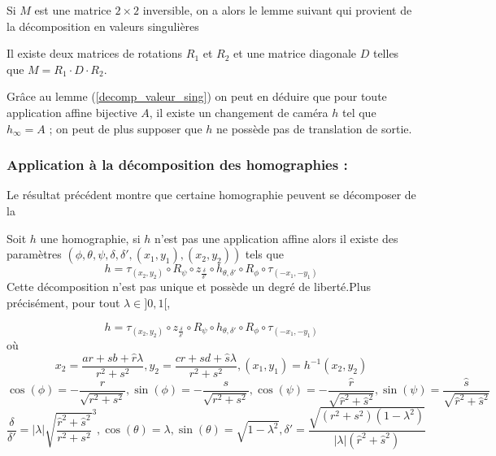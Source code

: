 \begin{remarque}
Si  $M$ est une matrice $2\times 2$ inversible, on a alors le lemme suivant qui provient de la décomposition en valeurs singulières \cite{morel2009asift}
\begin{lem}
Il existe deux matrices de rotations $R_1$ et $R_2$  et une matrice diagonale $D$ telles que $M = R_1 \cdot D \cdot R_2$.
\label{decomp_valeur_sing}
\end{lem}
Grâce au lemme (\ref{decomp_valeur_sing}) on peut en déduire que pour toute application affine bijective $A$, il existe un changement de caméra $h$ tel que $h_\infty = A$ ; on peut de plus supposer que $h$ ne possède pas de translation de sortie.
\end{remarque}


\subsubsection{Application à la décomposition des homographies :}
Le résultat précédent montre que certaine homographie peuvent se décomposer de la
\begin{thm}
Soit $h$ une homographie, si $h$ n'est pas une application affine alors il existe des paramètres $(\phi,\theta,\psi,\delta,\delta',(x_1,y_1),(x_2,y_2))$ tels que 
\begin{equation*}
h = \tau_{(x_2,y_2)} \circ R_{\psi} \circ z_{\frac{\delta}{\delta'}} \circ h_{\theta,\delta'} \circ R_{\phi} \circ \tau_{(-x_1,-y_1)}
\end{equation*}
Cette décomposition n'est pas unique et possède un degré de liberté.Plus précisément, pour tout $\lambda \in ]0,1[$,

  \begin{equation*}
h = \tau_{(x_2,y_2)} \circ z_{\frac{\delta}{\delta'}}  \circ R_{\psi} \circ h_{\theta,\delta'} \circ R_{\phi} \circ \tau_{(-x_1,-y_1)}
  \end{equation*}
  où 
 \begin{equation*}
x_2=\frac{ar+sb+\hat r \lambda}{r^2 +s^2}, y_2=\frac{cr+sd+\hat s \lambda}{r^2 +s^2}, (x_1 , y_1) = h^{-1}(x_{2},y_{2})
  \end{equation*}
 \begin{equation*}
 \cos( \phi )= - \frac{r}{\sqrt{r^2 + s^2}}, \sin( \phi )= - \frac{s}{\sqrt{r^2 + s^2}},\cos( \psi ) =- \frac{\hat r}{\sqrt{\hat r^2 + \hat s^2}}, \sin( \psi ) = \frac{\hat s}{\sqrt{\hat r^2 + \hat s^2}}
 \end{equation*}
 \begin{equation*}
 \frac{\delta}{\delta'}=|\lambda|\sqrt{\frac{\hat r^2 + \hat s^2}{r^2 + s^2}}^{3}, \cos(\theta)=\lambda, \sin(\theta)=\sqrt{1-\lambda^2}, \delta'=  \frac{\sqrt{(r^2 + s^2)(1-\lambda^2)}}{|\lambda| (\hat r^2+\hat s^2)}
 \end{equation*}
\label{thepropdecomp}
\end{thm}

